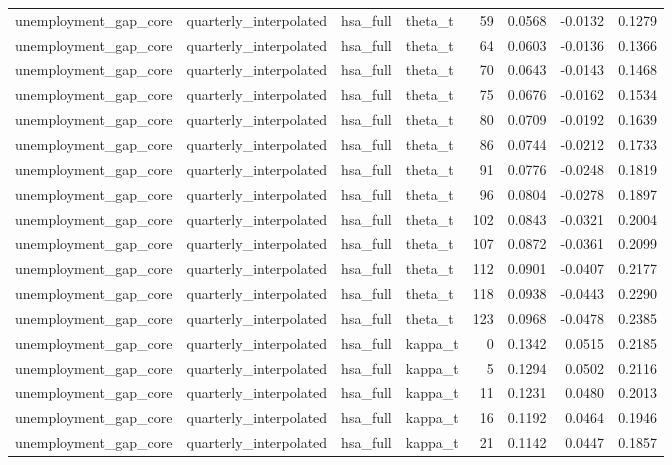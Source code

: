 \begin{tabular}{llllrrrr}
unemployment\_gap\_core & quarterly\_interpolated & hsa\_full & theta\_t & 59 & 0.0568 & -0.0132 & 0.1279 \\
unemployment\_gap\_core & quarterly\_interpolated & hsa\_full & theta\_t & 64 & 0.0603 & -0.0136 & 0.1366 \\
unemployment\_gap\_core & quarterly\_interpolated & hsa\_full & theta\_t & 70 & 0.0643 & -0.0143 & 0.1468 \\
unemployment\_gap\_core & quarterly\_interpolated & hsa\_full & theta\_t & 75 & 0.0676 & -0.0162 & 0.1534 \\
unemployment\_gap\_core & quarterly\_interpolated & hsa\_full & theta\_t & 80 & 0.0709 & -0.0192 & 0.1639 \\
unemployment\_gap\_core & quarterly\_interpolated & hsa\_full & theta\_t & 86 & 0.0744 & -0.0212 & 0.1733 \\
unemployment\_gap\_core & quarterly\_interpolated & hsa\_full & theta\_t & 91 & 0.0776 & -0.0248 & 0.1819 \\
unemployment\_gap\_core & quarterly\_interpolated & hsa\_full & theta\_t & 96 & 0.0804 & -0.0278 & 0.1897 \\
unemployment\_gap\_core & quarterly\_interpolated & hsa\_full & theta\_t & 102 & 0.0843 & -0.0321 & 0.2004 \\
unemployment\_gap\_core & quarterly\_interpolated & hsa\_full & theta\_t & 107 & 0.0872 & -0.0361 & 0.2099 \\
unemployment\_gap\_core & quarterly\_interpolated & hsa\_full & theta\_t & 112 & 0.0901 & -0.0407 & 0.2177 \\
unemployment\_gap\_core & quarterly\_interpolated & hsa\_full & theta\_t & 118 & 0.0938 & -0.0443 & 0.2290 \\
unemployment\_gap\_core & quarterly\_interpolated & hsa\_full & theta\_t & 123 & 0.0968 & -0.0478 & 0.2385 \\
unemployment\_gap\_core & quarterly\_interpolated & hsa\_full & kappa\_t & 0 & 0.1342 & 0.0515 & 0.2185 \\
unemployment\_gap\_core & quarterly\_interpolated & hsa\_full & kappa\_t & 5 & 0.1294 & 0.0502 & 0.2116 \\
unemployment\_gap\_core & quarterly\_interpolated & hsa\_full & kappa\_t & 11 & 0.1231 & 0.0480 & 0.2013 \\
unemployment\_gap\_core & quarterly\_interpolated & hsa\_full & kappa\_t & 16 & 0.1192 & 0.0464 & 0.1946 \\
unemployment\_gap\_core & quarterly\_interpolated & hsa\_full & kappa\_t & 21 & 0.1142 & 0.0447 & 0.1857 \\

\end{tabular}
